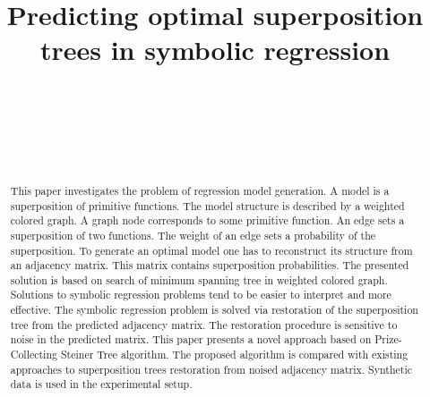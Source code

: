 \documentclass[11pt, tightenlines, twoside, onecolumn, nofloats, nobibnotes, nofootinbib, superscriptaddress, noshowpacks, centertags]{revtex4}
\begin{document}
\newcommand{\ls}{[}
\newcommand{\rs}{]}
\newcommand{\lp}{\big(}
\newcommand{\rp}{\big)}
\renewcommand{\bold}{\mathbf}
\theoremstyle{remark}

\newtheorem*{remark}{Remark}
\newtheorem{claim}{Claim}

\title{Predicting optimal superposition trees in symbolic regression}

\author{~}

\author{~}

\author{~}




\begin{abstract} %
This paper investigates the problem of regression model  generation. A model is a superposition of primitive functions. The model structure is described by a weighted colored graph. A graph node corresponds to some primitive function. An edge sets a superposition of two functions. The weight of an edge sets a probability of the superposition. To generate an optimal model one  has to reconstruct its structure from an adjacency matrix. This matrix contains superposition probabilities. The presented solution is based on search of minimum spanning tree in weighted colored graph. Solutions to symbolic regression problems tend to be easier to interpret and more effective. The symbolic regression problem is solved via restoration of the superposition tree from the predicted adjacency matrix. The restoration procedure is sensitive to noise in the predicted matrix. This paper presents a novel approach based on Prize-Collecting Steiner Tree algorithm. The proposed algorithm is compared with existing approaches to superposition trees restoration from noised adjacency matrix. Synthetic data is used in the experimental setup.
\end{abstract}
\end{document}
